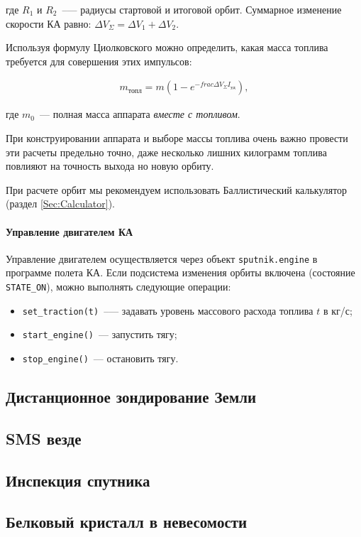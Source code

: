 \documentclass[12pt,a4paper]{article}
\begin{document}
где $R_1$ и $R_2$~--— радиусы стартовой и итоговой орбит. Суммарное изменение скорости КА
равно: $\Delta V_\Sigma = \Delta V_1 + \Delta V_2$.

Используя формулу Циолковского можно определить, какая масса топлива требуется для
совершения этих импульсов:

\begin{eqnarray}
  m_{\text{топл}} = m \left( 1 - e^{-frac{\Delta V_\Sigma}{I_{\text{уд}}}}\right), 
\end{eqnarray}

где $m_0$~--- полная масса аппарата \emph{вместе с топливом}.

При конструировании аппарата и выборе массы топлива очень важно провести эти расчеты
предельно точно, даже несколько лишних килограмм топлива повлияют на точность выхода но
новую орбиту.

При расчете орбит мы рекомендуем использовать Баллистический калькулятор (раздел
\ref{Sec:Calculator}).

\paragraph{Управление двигателем КА}

Управление двигателем осуществляется через объект \verb'sputnik.engine' в программе полета
КА. Если подсистема изменения орбиты включена (состояние \verb'STATE_ON'), можно выполнять
следующие операции:

\begin{itemize}
\item \verb'set_traction(t)'~--— задавать уровень массового расхода топлива $t$ в кг/с;
\item \verb'start_engine()'~--- запустить тягу;
\item \verb'stop_engine()'~--- остановить тягу.
\end{itemize}

\clearpage
\subsection{Дистанционное зондирование Земли}
\subsection{SMS везде}
\subsection{Инспекция спутника}
\subsection{Белковый кристалл в невесомости}
\end{document}
